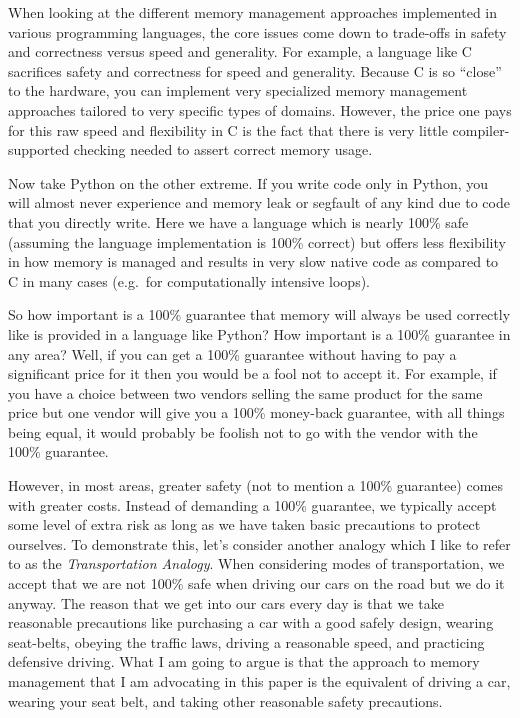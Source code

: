 \documentclass[pdf,ps2pdf,11pt]{SANDreport}
\begin{document}
When looking at the different memory management approaches implemented
in various programming languages, the core issues come down to trade-offs
in safety and correctness versus speed and generality.  For example, a
language like C sacrifices safety and correctness for speed and
generality.  Because C is so ``close'' to the hardware, you can
implement very specialized memory management approaches tailored to
very specific types of domains.  However, the price one pays for this
raw speed and flexibility in C is the fact that there is very little
compiler-supported checking needed to assert correct memory usage.

Now take Python on the other extreme.  If you write code only in
Python, you will almost never experience and memory leak or segfault
of any kind due to code that you directly write.  Here we have a
language which is nearly 100\% safe (assuming the language
implementation is 100\% correct) but offers less flexibility in how
memory is managed and results in very slow native code as compared to
C in many cases (e.g.\ for computationally intensive loops).

So how important is a 100\% guarantee that memory will always be used
correctly like is provided in a language like Python?  How important
is a 100\% guarantee in any area?  Well, if you can get a 100\%
guarantee without having to pay a significant price for it then you
would be a fool not to accept it.  For example, if you have a choice
between two vendors selling the same product for the same price but
one vendor will give you a 100\% money-back guarantee, with all things
being equal, it would probably be foolish not to go with the vendor
with the 100\% guarantee.

However, in most areas, greater safety (not to mention a 100\%
guarantee) comes with greater costs.  Instead of demanding a 100\%
guarantee, we typically accept some level of extra risk as long as we
have taken basic precautions to protect ourselves.  To demonstrate
this, let's consider another analogy which I like to refer to as the
{}\textit{Transportation Analogy}.  When considering modes of
transportation, we accept that we are not 100\% safe when driving our
cars on the road but we do it anyway.  The reason that we get into our
cars every day is that we take reasonable precautions like purchasing
a car with a good safely design, wearing seat-belts, obeying the
traffic laws, driving a reasonable speed, and practicing defensive
driving.  What I am going to argue is that the approach to memory
management that I am advocating in this paper is the equivalent of
driving a car, wearing your seat belt, and taking other reasonable
safety precautions.
\end{document}
